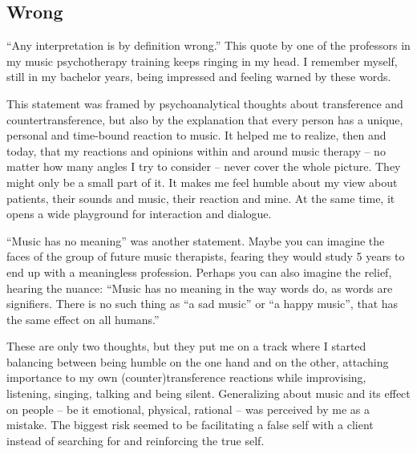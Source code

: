 \documentclass[authordate, empirical, issue]{jote-new-article}
\author[1]{\mbox{Nele Fiers\orcid{0000-0002-8394-8598}}}
\affil[1]{Kliniek Sint-Jozef Pittem - Muze op maat}
\begin{document}
\begin{frontmatter}
  \maketitle
  \begin{abstract}
    \printabstracttext
  \end{abstract}
\end{frontmatter}



\setcounter{page}{29}

\subsection{Wrong}

“Any interpretation is by definition wrong.” This quote by one of the professors in my music psychotherapy training keeps ringing in my head. I remember myself, still in my bachelor years, being impressed and feeling warned by these words.



This statement was framed by psychoanalytical thoughts about transference and countertransference, but also by the explanation that every person has a unique, personal and time-bound reaction to music. It helped me to realize, then and today, that my reactions and opinions within and around music therapy -- no matter how many angles I try to consider -- never cover the whole picture. They might only be a small part of it. It makes me feel humble about my view about patients, their sounds and music, their reaction and mine. At the same time, it opens a wide playground for interaction and dialogue.



“Music has no meaning” was another statement. Maybe you can imagine the faces of the group of future music therapists, fearing they would study 5 years to end up with a meaningless profession. Perhaps you can also imagine the relief, hearing the nuance: “Music has no meaning in the way words do, as words are signifiers. There is no such thing as “a sad music” or “a happy music”, that has the same effect on all humans.”



These are only two thoughts, but they put me on a track where I started balancing between being humble on the one hand and on the other, attaching importance to my own (counter)transference reactions while improvising, listening, singing, talking and being silent. Generalizing about music and its effect on people -- be it emotional, physical, rational -- was perceived by me as a mistake. The biggest risk seemed to be facilitating a false self with a client instead of searching for and reinforcing the true self.
\end{document}
